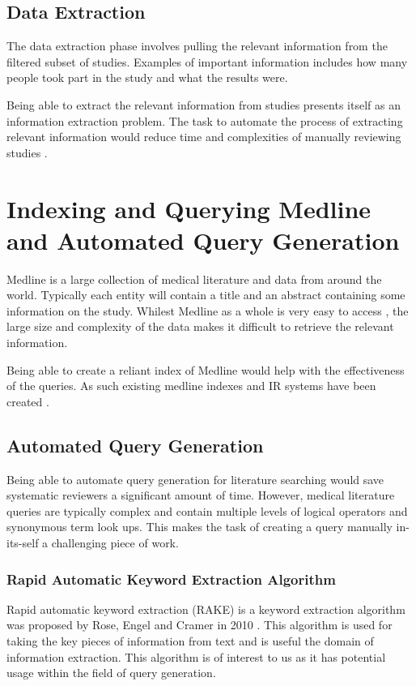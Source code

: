 \subsection{Data Extraction}

The data extraction phase involves pulling the relevant information from the filtered subset of studies. Examples of important information includes how many people took part in the study and what the results were.

Being able to extract the relevant information from studies presents itself as an information extraction problem. The task to automate the process of extracting relevant information would reduce time and complexities of manually reviewing studies \cite{Siddhartha2015}.


\section{Indexing and Querying Medline and Automated Query Generation}

Medline is a large collection of medical literature and data from around the world. Typically each entity will contain a title and an abstract containing some information on the study. Whilest Medline as a whole is very easy to access \cite{medline}, the large size and complexity of the data makes it difficult to retrieve the relevant information.

Being able to create a reliant index of Medline would help with the effectiveness of the queries. As such existing medline indexes and IR systems have been created \cite{nlm}.

\subsection{Automated Query Generation}

Being able to automate query generation for literature searching would save systematic reviewers a significant amount of time. However, medical literature queries are typically complex and contain multiple levels of logical operators and synonymous term look ups. This makes the task of creating a query manually in-its-self a challenging piece of work.

\subsubsection{Rapid Automatic Keyword Extraction Algorithm}

Rapid automatic keyword extraction (RAKE) is a keyword extraction algorithm was proposed by Rose, Engel and Cramer in 2010 \cite{rake}. This algorithm is used for taking the key pieces of information from text and is useful the domain of information extraction. This algorithm is of interest to us as it has potential usage within the field of query generation.

